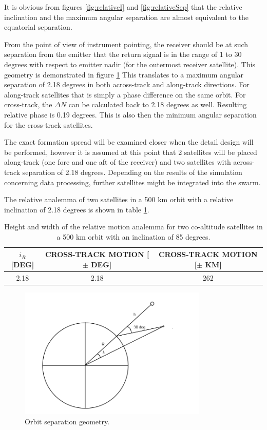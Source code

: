It is obvious from figures \ref{fig:relativeI} and \ref{fig:relativeSep} that the relative inclination and the maximum angular separation are almost equivalent to the equatorial separation. 

From the point of view of instrument pointing, the receiver should be at such separation from the emitter that the return signal is in the range of 1 to 30 degrees with respect to emitter nadir (for the outermost receiver satellite). This geometry is demonstrated in figure \ref{fig:separation} This translates to a maximum angular separation of 2.18 degrees in both across-track and along-track directions. For along-track satellites that is simply a phase difference on the same orbit. For cross-track, the $\Delta N$ can be calculated back to 2.18 degrees as well. Resulting relative phase is 0.19 degrees. This is also then the minimum angular separation for the cross-track satellites.

The exact formation spread will be examined closer when the detail design will be performed, however it is assumed at this point that 2 satellites will be placed along-track (one fore and one aft of the receiver) and two satellites with across-track separation of 2.18 degrees. Depending on the results of the simulation concerning data processing, further satellites might be integrated into the swarm.

The relative analemma of two satellites in a 500 km orbit with a relative inclination of 2.18 degrees is shown in table \ref{table:analemma}.

\begin{table}[ht]
	\centering
		\begin{tabular}{c |c | c }
		 $i_R$ [DEG] & CROSS-TRACK MOTION [$\pm$ DEG] & CROSS-TRACK MOTION [$\pm$ KM] \\ \hline \hline
		 2.18 & 2.18 & 262 
		\end{tabular}
	\caption{Height and width of the relative motion analemma for two co-altitude satellites in a 500 km orbit with an inclination of 85 degrees.}
	\label{table:analemma}
\end{table}

\begin{figure}[!ht]
\centering
\includegraphics[width=0.8\textwidth, angle=0]{chapters/img/seperation.png}

\caption{Orbit separation geometry.}
\label{fig:separation}
\end{figure}

